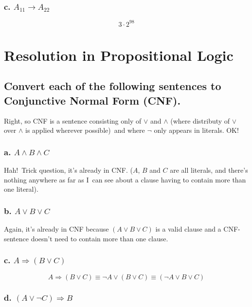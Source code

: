 \documentclass{article}
\begin{document}
\subsubsection{c. $A_{11}\rightarrow A_{22}$}

\[
3\cdot 2^{98} 
\]

\section{Resolution in Propositional Logic}

\subsection{Convert each of the following sentences to Conjunctive Normal
Form (CNF).}

Right, so CNF is a sentence consisting only of $\vee $ and $\wedge $ (where
distributy of $\vee $ over $\wedge $ is applied wherever possible)\ and
where $\lnot $ only appears in literals. OK!

\subsubsection{a. $A\wedge B\wedge C$}

Hah!\ Trick question, it's already in CNF. ($A$, $B$ and $C$ are all
literals, and there's nothing anywhere as far as I\ can see about a clause
having to contain more than one literal).

\subsubsection{b. $A\vee B\vee C$}

Again, it's already in CNF because $\left( A\vee B\vee C\right) $ is a valid
clause and a CNF-sentence doesn't need to contain more than one clause.

\subsubsection{c. $A\Rightarrow \left( B\vee C\right) $}

\[
A\Rightarrow \left( B\vee C\right) \equiv \lnot A\vee \left( B\vee C\right)
\equiv \left( \lnot A\vee B\vee C\right) 
\]

\subsubsection{d. $\left( A\vee \lnot C\right) \Rightarrow B$}
\end{document}
